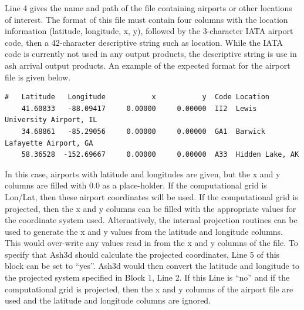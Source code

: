 Line 4 gives the name and path of the file containing airports or other locations
of interest.  The format of this file must contain four columns with the location
information (latitude, longitude, x, y), followed by the 3-character IATA airport
code, then a 42-character descriptive string such as location.  While the IATA
code is currently not used in any output products, the descriptive
string is use in ash arrival output products.  An example of the expected format
for the airport file is given below.
\small
\begin{verbatim}
#   Latitude   Longitude           x           y  Code Location
    41.60833   -88.09417     0.00000     0.00000  II2  Lewis University Airport, IL
    34.68861   -85.29056     0.00000     0.00000  GA1  Barwick Lafayette Airport, GA
    58.36528  -152.69667     0.00000     0.00000  A33  Hidden Lake, AK
\end{verbatim}
\normalsize
In this case, airports with latitude and longitudes are given, but the x and y
columns are filled with 0.0 as a place-holder.  If the computational grid is
Lon/Lat, then these airport coordinates will be used.  If the computational 
grid is projected, then the x and y columns can be filled with the appropriate
values for the coordinate system used.  Alternatively, the internal projection routines
can be used to generate the x and y values from the latitude and longitude columns.
This would over-write any values read in from the x and y columns of the file.
To specify that Ash3d should calculate the projected coordinates, Line 5 of
this block can be set to ``yes''.  Ash3d would then convert the latitude and longitude
to the projected system specified in Block 1, Line 2.  If this Line is ``no'' and 
if the computational grid is projected, then the x and y columns of the airport
file are used and the latitude and longitude columns are ignored.  

